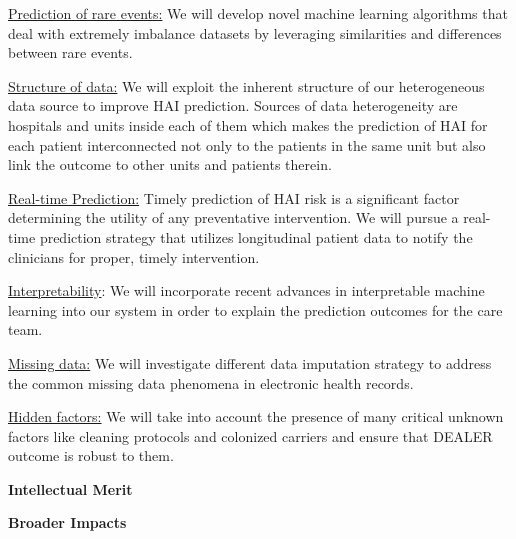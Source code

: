 \underline{Prediction of rare events:} We will develop novel machine learning algorithms that deal with extremely imbalance datasets by leveraging similarities and differences between rare events. 

\underline{Structure of data:} We will exploit the inherent structure of our heterogeneous data source to improve HAI prediction. Sources of data heterogeneity are hospitals and units inside each of them which makes the prediction of HAI for each patient interconnected not only to the patients in the same unit but also link the outcome to other units and patients therein. 

\underline{Real-time Prediction:} Timely prediction of HAI risk is a significant factor determining the utility of any preventative intervention. We will pursue a real-time prediction strategy that utilizes longitudinal patient data to notify the clinicians for proper, timely intervention.  

\underline{Interpretability}: We will incorporate recent advances in interpretable machine learning into our system in order to explain the prediction outcomes for the care team. 

\underline{Missing data:} We will investigate different data imputation strategy to address the common missing data phenomena in electronic health records.  

\underline{Hidden factors:} We will take into account the presence of many critical unknown factors like cleaning protocols and colonized carriers and ensure that DEALER outcome is robust to them.



{\bf Intellectual Merit} 

{\bf Broader Impacts} 

